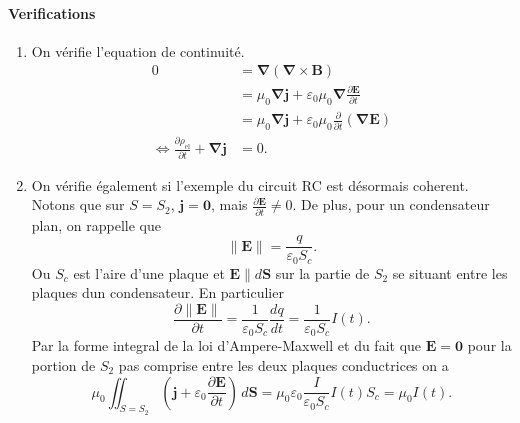 \paragraph{Verifications}
\begin{enumerate}
\item On vérifie l'equation de continuité. 
\begin{align*}
0 & =\boldsymbol{\nabla}(\boldsymbol{\nabla}\times \boldsymbol{B}) \\
 & =\mu_{0}\boldsymbol{\nabla j}+\varepsilon_{0}\mu_{0}\boldsymbol{\nabla}\frac{ \partial \boldsymbol{E} }{ \partial t }  \\
 & =\mu_{0}\boldsymbol{\nabla j}+\varepsilon_{0}\mu_{0}\frac{ \partial  }{ \partial t } (\boldsymbol{\nabla E}) \\
\Leftrightarrow \frac{ \partial \rho _{\mathrm{el}} }{ \partial t } +\boldsymbol{\nabla j} & =0.
\end{align*}
\item On vérifie également si l'exemple du circuit RC est désormais coherent. Notons que sur $S=S_{2}$, $\boldsymbol{j}=\boldsymbol{0}$, mais $\frac{ \partial \boldsymbol{E} }{ \partial t }\neq 0$. De plus, pour un condensateur plan, on rappelle que 
$$
\lVert \boldsymbol{E} \rVert =\frac{q}{\varepsilon_{0}S_{c}}.
$$
Ou $S_{c}$ est l'aire d'une plaque et $\boldsymbol{E}\parallel d\boldsymbol{S}$ sur la partie de $S_{2}$ se situant entre les plaques dun condensateur. En particulier 
$$
\frac{ \partial \lVert \boldsymbol{E} \rVert  }{ \partial t } =\frac{1}{\varepsilon_{0}S_{c}} \frac{dq}{dt}=\frac{1}{\varepsilon_{0}S_{c}}I(t).
$$
Par la forme integral de la loi d'Ampere-Maxwell et du fait que $\boldsymbol{E}=\boldsymbol{0}$ pour la portion de $S_{2}$ pas comprise entre les deux plaques conductrices on a
$$
\mu_{0}\iint _{S=S_{2}}\left( \boldsymbol{j}+\varepsilon_{0}\frac{ \partial \boldsymbol{E} }{ \partial t }  \right)\,d\boldsymbol{S}=\mu_{0}\varepsilon_{0} \frac{I}{\varepsilon_{0}S_{c}}I(t)S_{c}=\mu_{0}I(t).
$$
\end{enumerate}
